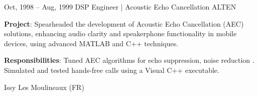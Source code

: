 \documentclass[
  a4paper,
   maincolor=cvblue,
   sectioncolor=cvblue,
   sidebarwidth=0.323\paperwidth,
]{fortysecondscv}
\begin{document}
\begin{cvtableNew}
    \vspace{1.87mm} %

    \cvitemRightNew
    {Oct, 1998 – Aug, 1999} %
    {DSP Engineer | Acoustic Echo Cancellation} %
    {ALTEN} %
    {
      \vspace{1pt}
      \fontsize{10.8pt}{12pt}\selectfont %
      \textbf{Project}: Spearheaded the development of Acoustic Echo Cancellation (AEC) solutions, enhancing audio clarity and speakerphone functionality in mobile devices, using advanced MATLAB and C++ techniques.\par
      \vspace{3.6pt}
      \textbf{Responsibilities}: Tuned AEC algorithms for echo suppression, noise reduction
      . Simulated and tested hands-free calls using a Visual C++
      executable.
    }
    {Issy Les Moulineaux (FR)} %


\end{cvtableNew}
\end{document}

